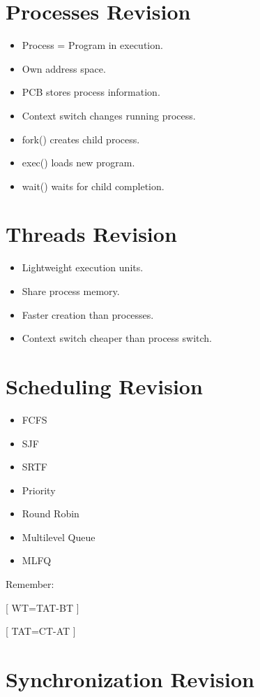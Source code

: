 \section{Processes Revision}

\begin{itemize}
\item Process = Program in execution.
\item Own address space.
\item PCB stores process information.
\item Context switch changes running process.
\item fork() creates child process.
\item exec() loads new program.
\item wait() waits for child completion.
\end{itemize}

\section{Threads Revision}

\begin{itemize}
\item Lightweight execution units.
\item Share process memory.
\item Faster creation than processes.
\item Context switch cheaper than process switch.
\end{itemize}

\section{Scheduling Revision}

\begin{itemize}
\item FCFS
\item SJF
\item SRTF
\item Priority
\item Round Robin
\item Multilevel Queue
\item MLFQ
\end{itemize}

Remember:

[
WT=TAT-BT
]

[
TAT=CT-AT
]

\section{Synchronization Revision}

